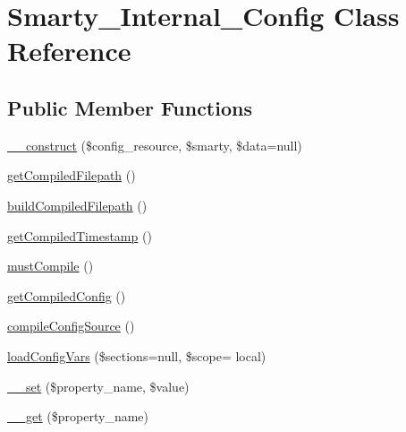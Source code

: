 \hypertarget{class_smarty___internal___config}{}\section{Smarty\+\_\+\+Internal\+\_\+\+Config Class Reference}
\label{class_smarty___internal___config}
\subsection*{Public Member Functions}
\begin{DoxyCompactItemize}
\item 
\hyperlink{class_smarty___internal___config_a2a663b2f10f3f650d84094063af27141}{\+\_\+\+\_\+construct} (\$config\+\_\+resource, \$smarty, \$data=null)
\item 
\hyperlink{class_smarty___internal___config_ae177a64e9bb82ec1198d7b60f0a0e488}{get\+Compiled\+Filepath} ()
\item 
\hyperlink{class_smarty___internal___config_a422acfa39a2bd406a32416f4cc96b17d}{build\+Compiled\+Filepath} ()
\item 
\hyperlink{class_smarty___internal___config_ac4f92266dc5d54a4ab3200db6b05f688}{get\+Compiled\+Timestamp} ()
\item 
\hyperlink{class_smarty___internal___config_ac46605e0bc23758fe5854820ab1acfe5}{must\+Compile} ()
\item 
\hyperlink{class_smarty___internal___config_a98dc94422b55d3f91010c0f5027384f4}{get\+Compiled\+Config} ()
\item 
\hyperlink{class_smarty___internal___config_a5cd226bd4e33f00456717a0db568a5e9}{compile\+Config\+Source} ()
\item 
\hyperlink{class_smarty___internal___config_a4de780e753e6472cc2a2b501e66403f7}{load\+Config\+Vars} (\$sections=null, \$scope= \textquotesingle{}local\textquotesingle{})
\item 
\hyperlink{class_smarty___internal___config_a3a449beac9d0c7fdd8325b61b21f52a0}{\+\_\+\+\_\+set} (\$property\+\_\+name, \$value)
\item 
\hyperlink{class_smarty___internal___config_a51458d48bdbac63ccde60e4ae3357388}{\+\_\+\+\_\+get} (\$property\+\_\+name)
\end{DoxyCompactItemize}
